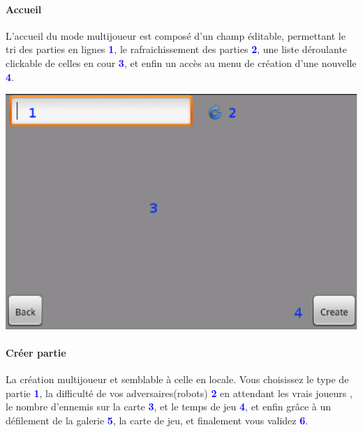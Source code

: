 	\paragraph{Accueil}
	L'accueil du mode multijoueur est composé d'un champ éditable, permettant le
	tri des parties en lignes \textcolor{blue}{\textbf{1}}, le rafraichissement des
	parties \textcolor{blue}{\textbf{2}}, une liste déroulante clickable de celles
	en cour \textcolor{blue}{\textbf{3}}, et enfin un accès au menu de création
	d'une nouvelle \textcolor{blue}{\textbf{4}}.
	
		
	\begin{center}
		\includegraphics[scale=0.7]{Manuel/Img/19.eps}
	\end{center}
	
	\paragraph{Créer partie}
	La création multijoueur et semblable à celle en locale.
	Vous choisissez le type de partie
	\textcolor{blue}{\textbf{1}}, la difficulté de vos adversaires(robots)
	\textcolor{blue}{\textbf{2}} en attendant les vrais joueurs , le nombre d'ennemis
	sur la carte \textcolor{blue}{\textbf{3}}, et le temps de jeu \textcolor{blue}{\textbf{4}},
	et enfin grâce à un défilement de la galerie \textcolor{blue}{\textbf{5}}, la
	carte de jeu, et finalement vous validez \textcolor{blue}{\textbf{6}}.
	
